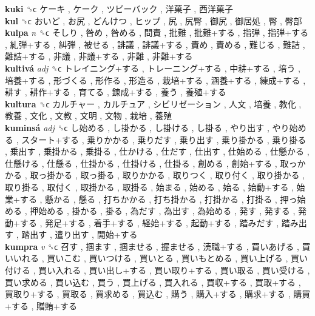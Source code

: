 \textbf{kuki} ␝ϲ   ケーキ ,  ケーク ,  ツビーバック ,  洋菓子 ,  西洋菓子   \\
\textbf{kul} ␝ϲ   おいど ,  お尻 ,  どんけつ ,  ヒップ ,  尻 ,  尻臀 ,  御尻 ,  御居処 ,  臀 ,  臀部   \\
\textbf{kulpa} \emph{n}  ␝ϲ   そしり ,  咎め ,  咎める ,  問責 ,  批難 ,  批難+する ,  指弾 ,  指弾+する ,  糺弾+する ,  糾弾 ,  被せる ,  誹議 ,  誹議+する ,  責め ,  責める ,  難じる ,  難詰 ,  難詰+する ,  非議 ,  非議+する ,  非難 ,  非難+する   \\
\textbf{kultivá} \emph{adj}  ␝ϲ   トレイニング+する ,  トレーニング+する ,  中耕+する ,  培う ,  培養+する ,  形づくる ,  形作る ,  形造る ,  栽培+する ,  涵養+する ,  練成+する ,  耕す ,  耕作+する ,  育てる ,  錬成+する ,  養う ,  養殖+する   \\
\textbf{kultura} ␝ϲ   カルチャー ,  カルチュア ,  シビリゼーション ,  人文 ,  培養 ,  教化 ,  教養 ,  文化 ,  文教 ,  文明 ,  文物 ,  栽培 ,  養殖   \\
\textbf{kuminsá} \emph{adj}  ␝ϲ   し始める ,  し掛かる ,  し掛ける ,  し掛る ,  やり出す ,  やり始める ,  スタート+する ,  乗りかかる ,  乗りだす ,  乗り出す ,  乗り掛かる ,  乗り掛る ,  乗出す ,  乗掛かる ,  乗掛る ,  仕かける ,  仕だす ,  仕出す ,  仕始める ,  仕懸かる ,  仕懸ける ,  仕懸る ,  仕掛かる ,  仕掛ける ,  仕掛る ,  創める ,  創始+する ,  取っかかる ,  取っ掛かる ,  取っ掛る ,  取りかかる ,  取りつく ,  取り付く ,  取り掛かる ,  取り掛る ,  取付く ,  取掛かる ,  取掛る ,  始まる ,  始める ,  始る ,  始動+する ,  始業+する ,  懸かる ,  懸る ,  打ちかかる ,  打ち掛かる ,  打掛かる ,  打掛る ,  押っ始める ,  押始める ,  掛かる ,  掛る ,  為だす ,  為出す ,  為始める ,  発す ,  発する ,  発動+する ,  発足+する ,  着手+する ,  経始+する ,  起動+する ,  踏みだす ,  踏み出す ,  踏出す ,  遣り出す ,  開始+する   \\
\textbf{kumpra} \emph{v}  ␝ϲ   召す ,  掴ます ,  掴ませる ,  握ませる ,  涜職+する ,  買いあげる ,  買いいれる ,  買いこむ ,  買いつける ,  買いとる ,  買いもとめる ,  買い上げる ,  買い付ける ,  買い入れる ,  買い出し+する ,  買い取り+する ,  買い取る ,  買い受ける ,  買い求める ,  買い込む ,  買う ,  買上げる ,  買入れる ,  買収+する ,  買取+する ,  買取り+する ,  買取る ,  買求める ,  買込む ,  購う ,  購入+する ,  購求+する ,  購買+する ,  贈賄+する   \\
